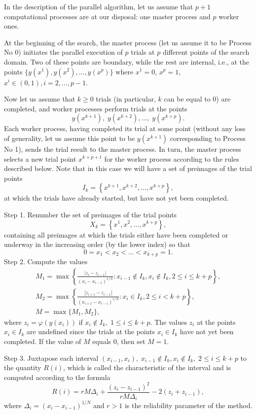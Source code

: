 \documentclass{svproc}
\begin{document}
In the description of the parallel algorithm, let us assume that $p+1$ computational processes are at our disposal: one master process and $p$ worker ones.
 
At the beginning of the search, the master process (let us assume it to be Process No 0) initiates the parallel execution of $p$ trials at $p$ different points of the search domain. 
Two of these points are boundary, while the rest are internal, i.e., at the points $\{y(x^1), y(x^2), ...,y(x^p)\}$ where 
$x^1 = 0$, $x^p = 1$, $x^i\in(0,1), i=2,..., p-1$.

Now let us assume that $k\geq 0$ trials (in particular, $k$ can be equal to 0) are completed, and worker processes perform trials at the points
$$y(x^{k+1}), \; y(x^{k+2}), ...,\; y(x^{k+p}).$$ 
Each worker process, having completed its trial at some point (without any loss of generality, let us assume this point to be $y(x^{k+1})$ corresponding to Process No 1), sends the trial result to the master process. 
In turn, the master process selects a new trial point $x^{k+p+1}$ for the worker process according to the rules described below.
Note that in this case we will have a set of preimages of the trial points
\[
I_k = \left\{ x^{k+1},x^{k+2},...,x^{k+p} \right\},
\]
at which the trials have already started, but have not yet been completed.

Step 1. Renumber the set of preimages of the trial points 
\[
X_k = \left\{x^1, x^2,...,x^{k+p} \right\},
\]
containing all preimages at which the trials either have been completed or underway in the increasing order (by the lower index) so that
\[
0=x_1<x_2<...<x_{k+p}=1.
\]
Step 2. Compute the values 
\begin{gather*}
M_1=\max \left\{ \frac{ \left|z_i - z_{i-1} \right|}{(x_i-x_{i-1})^{1/N}} : x_{i-1} \notin I_k, x_i \notin I_k, 2\leq i\leq k+p \right\},\\
M_2=\max \left\{ \frac{ \left|z_{i+1} - z_{i-1} \right|}{(x_{i+1}-x_{i-1})^{1/N}} : x_i \in I_k, 2\leq i < k+p \right\},\\
M=\max\{M_1,M_2\},
\end{gather*}
where $z_i=\varphi(y(x_i))$ if $x_i \notin I_k, \; 1\leq i \leq k+p$. The values $z_i$ at the points $x_i \in I_k$ are undefined since the trials at the points $x_i \in I_k$ have not yet been completed. If the value of $M$ equals 0, then set $M=1$.

Step 3. Juxtapose each interval $(x_{i-1},x_i), \; x_{i-1} \notin I_k, x_i \notin I_k, \; 2\leq i\leq k+p$ to the quantity $R(i)$, which is called the characteristic of the interval and is computed according to the formula
\begin{equation}\label{R}
R(i)=rM\Delta_i+\frac{(z_i-z_{i-1})^2}{rM\Delta_i}-2(z_i+z_{i-1}),
\end{equation}
where $\Delta_i=\left(x_i-x_{i-1}\right)^{1/N}$ and $r>1$ is the reliability parameter of the method.
\end{document}
